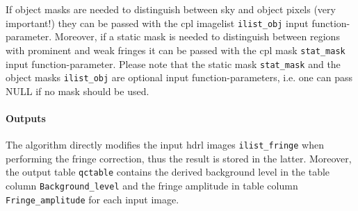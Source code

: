 If object masks are needed to distinguish between sky and object
pixels (very important!)  they can be passed with the cpl imagelist
\verb+ilist_obj+ input function-parameter.  Moreover, if a static mask
is needed to distinguish between regions with prominent and weak
fringes it can be passed with the cpl mask \verb+stat_mask+ input
function-parameter.  Please note that the static mask \verb,stat_mask,
and the object masks \verb,ilist_obj, are optional input
function-parameters, i.e. one can pass NULL if no mask should be used.

\paragraph{Outputs}
\label{fringe:algorithms:correct:outputs}

The algorithm directly modifies the input hdrl images
\verb+ilist_fringe+ when performing the fringe correction, thus the
result is stored in the latter. Moreover, the output
table \verb+qctable+ contains the derived background level in the
table column \verb+Background_level+ and the fringe amplitude in table
column \verb+Fringe_amplitude+ for each input image.
